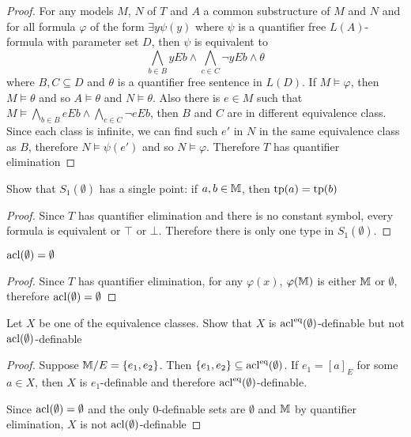 \documentclass[11pt]{article}
\begin{document}
\begin{proof}
For any models \(M\), \(N\) of \(T\) and \(A\) a common substructure of \(M\) and \(N\) and for all
formula \(\varphi\) of the form \(\exists y\psi(y)\) where \(\psi\) is a quantifier free \(L(A)\)-formula with
parameter set \(D\), then \(\psi\) is
equivalent to
\begin{equation*}
\bigwedge_{b\in B}yEb\wedge\bigwedge_{c\in C}\neg yEb\wedge\theta
\end{equation*}
where \(B,C\subseteq D\) and \(\theta\) is a quantifier free sentence in \(L(D)\). If \(M\vDash\varphi\), then \(M\vDash\theta\) and
so \(A\vDash\theta\) and \(N\vDash\theta\). Also there is \(e\in M\) such that \(M\vDash\bigwedge_{b\in B}eEb\wedge\bigwedge_{c\in C}\neg eEb\),
then \(B\) and \(C\) are in different equivalence class. Since each class is infinite, we can find
such \(e'\)  in \(N\) in the same equivalence class as \(B\), therefore \(N\vDash\psi(e')\) and so \(N\vDash\varphi\).
Therefore \(T\) has quantifier elimination
\end{proof}

\begin{exercise}
Show that \(S_1(\emptyset)\) has a single point: if \(a,b\in\mathbb{M}\), then \(\operatorname{tp}(a)=\operatorname{tp}(b)\)
\end{exercise}

\begin{proof}
Since \(T\) has quantifier elimination and there is no constant symbol, every formula is equivalent
or \(\top\) or \(\bot\). Therefore there is only one type in \(S_1(\emptyset)\).
\end{proof}

\begin{exercise}
\(\operatorname{acl}(\emptyset)=\emptyset\)
\end{exercise}

\begin{proof}
Since \(T\) has quantifier elimination, for any \(\varphi(x)\), \(\varphi(\mathbb{M})\) is either \(\mathbb{M}\) or \(\emptyset\),
therefore \(\operatorname{acl}(\emptyset)=\emptyset\)
\end{proof}

\begin{exercise}
Let \(X\) be one of the equivalence classes. Show that \(X\) is \(\operatorname{acl}^{\operatorname{eq}}(\emptyset)\)-definable but not \(\operatorname{acl}(\emptyset)\)-definable
\end{exercise}

\begin{proof}
Suppose \(\mathbb{M}/E=\{e_1,e_2\}\). Then \(\{e_1,e_2\}\subseteq\operatorname{acl}^{\operatorname{eq}}(\emptyset)\). If \(e_1=[a]_E\) for some \(a\in X\),
then \(X\) is \(e_1\)-definable and therefore \(\operatorname{acl}^{\operatorname{eq}}(\emptyset)\)-definable.

Since \(\operatorname{acl}(\emptyset)=\emptyset\) and the only 0-definable sets are \(\emptyset\) and \(\mathbb{M}\) by quantifier
elimination, \(X\) is not \(\operatorname{acl}(\emptyset)\)-definable
\end{proof}
\end{document}
